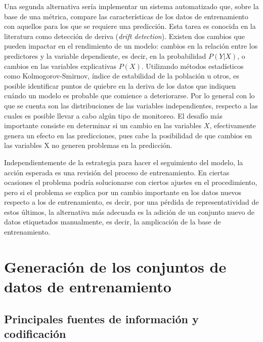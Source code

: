 \documentclass[
  12pt,
  spanish,
]{article}
\begin{document}
Una segunda alternativa sería implementar un sistema automatizado que,
sobre la base de una métrica, compare las características de los datos
de entrenamiento con aquellos para los que se requiere una predicción.
Esta tarea es conocida en la literatura como detección de deriva
(\emph{drift detection}). Existen dos cambios que pueden impactar en el
rendimiento de un modelo: cambios en la relación entre los predictores y
la variable dependiente, es decir, en la probabilidad \(P(Y|X)\), o
cambios en las variables explicativas \(P(X)\). Utilizando métodos
estadísticos como Kolmogorov-Smirnov, índice de estabilidad de la
población u otros, es posible identificar puntos de quiebre en la deriva
de los datos que indiquen cuándo un modelo es probable que comience a
deteriorarse. Por lo general con lo que se cuenta son las distribuciones
de las variables independientes, respecto a las cuales es posible llevar
a cabo algún tipo de monitoreo. El desafío más importante consiste en
determinar si un cambio en las variables \(X\), efectivamente genera un
efecto en las predicciones, pues cabe la posibilidad de que cambios en
las variables X no generen problemas en la predicción.

Independientemente de la estrategia para hacer el seguimiento del
modelo, la acción esperada es una revisión del proceso de entrenamiento.
En ciertas ocasiones el problema podría solucionarse con ciertos ajustes
en el procedimiento, pero si el problema se explica por un cambio
importante en los datos nuevos respecto a los de entrenamiento, es
decir, por una pérdida de representatividad de estos últimos, la
alternativa más adecuada es la adición de un conjunto nuevo de datos
etiquetados manualmente, es decir, la amplicación de la base de
entrenamiento.

\hypertarget{generaciuxf3n-de-los-conjuntos-de-datos-de-entrenamiento}{%
\section{Generación de los conjuntos de datos de
entrenamiento}\label{generaciuxf3n-de-los-conjuntos-de-datos-de-entrenamiento}}

\hypertarget{principales-fuentes-de-informaciuxf3n-y-codificaciuxf3n}{%
\subsection{Principales fuentes de información y
codificación}\label{principales-fuentes-de-informaciuxf3n-y-codificaciuxf3n}}
\end{document}
